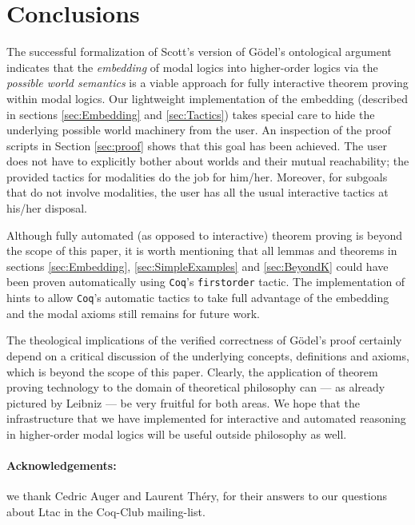 \documentclass{llncs}
\newcommand{\Coq}{\texttt{Coq}\xspace}
\begin{document}
\section{Conclusions}
\label{sec:conclusions}

The successful formalization of Scott's version of  G\"odel's
ontological argument indicates that the \emph{embedding} of  modal
logics into higher-order logics via the \emph{possible world
semantics} is a viable approach for fully interactive theorem proving
within modal logics. Our lightweight implementation of the embedding
(described in sections \ref{sec:Embedding} and \ref{sec:Tactics})
takes special care to hide the underlying possible world machinery
from the user. An inspection of the proof scripts in Section
\ref{sec:proof} shows that this goal has been achieved. The user does
not have to explicitly bother about worlds and their mutual
reachability; the provided tactics for modalities do the job for
him/her. Moreover, for subgoals that do not involve modalities, the
user has all the usual interactive tactics at his/her disposal.

Although fully automated (as opposed to interactive) theorem proving
is beyond the scope of this paper, it is worth mentioning that all
lemmas and theorems in sections \ref{sec:Embedding},
\ref{sec:SimpleExamples} and \ref{sec:BeyondK} could have been proven
automatically using \Coq's \texttt{firstorder} tactic. The
implementation of hints to allow \Coq's automatic tactics to take full
advantage of the embedding and the modal axioms still remains for
future work.

The theological implications of the verified correctness of Gödel's
proof certainly depend on a critical discussion of the underlying
concepts, definitions and axioms, which is beyond the scope of this
paper.  Clearly, the application of theorem proving technology to the
domain of theoretical philosophy can --- as already pictured by
Leibniz --- be very fruitful for both areas. We hope that the
infrastructure  that we have implemented for interactive and automated
reasoning in higher-order modal logics will be useful outside
philosophy as well.


\paragraph{Acknowledgements:} we thank Cedric Auger and Laurent Théry, 
for their answers to our questions about Ltac in the Coq-Club mailing-list. 
\end{document}
